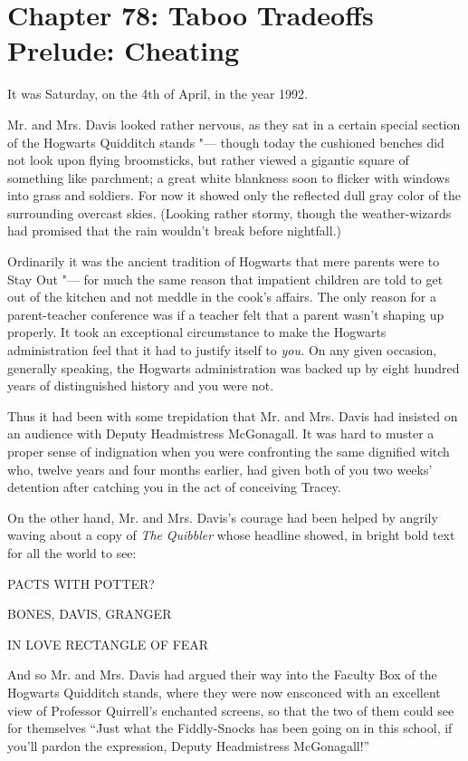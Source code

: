 \chapter{Chapter 78: Taboo Tradeoffs Prelude: Cheating}
It was Saturday, on the 4th of April, in the year 1992.

Mr. and Mrs. Davis looked rather nervous, as they sat in a certain
special section of the Hogwarts Quidditch stands "--- though today the
cushioned benches did not look upon flying broomsticks, but rather
viewed a gigantic square of something like parchment; a great white
blankness soon to flicker with windows into grass and soldiers. For now
it showed only the reflected dull gray color of the surrounding overcast
skies. (Looking rather stormy, though the weather-wizards had promised
that the rain wouldn't break before nightfall.)

Ordinarily it was the ancient tradition of Hogwarts that mere parents
were to Stay Out "--- for much the same reason that impatient children are
told to get out of the kitchen and not meddle in the cook's affairs. The
only reason for a parent-teacher conference was if a teacher felt that a
parent wasn't shaping up properly. It took an exceptional circumstance
to make the Hogwarts administration feel that it had to justify itself
to \emph{you.} On any given occasion, generally speaking, the Hogwarts
administration was backed up by eight hundred years of distinguished
history and you were not.

Thus it had been with some trepidation that Mr. and Mrs. Davis had
insisted on an audience with Deputy Headmistress McGonagall. It was hard
to muster a proper sense of indignation when you were confronting the
same dignified witch who, twelve years and four months earlier, had
given both of you two weeks' detention after catching you in the act of
conceiving Tracey.

On the other hand, Mr. and Mrs. Davis's courage had been helped by
angrily waving about a copy of \emph{The} \emph{Quibbler} whose headline
showed, in bright bold text for all the world to see:

PACTS WITH POTTER?

BONES, DAVIS, GRANGER

IN LOVE RECTANGLE OF FEAR

And so Mr. and Mrs. Davis had argued their way into the Faculty Box of
the Hogwarts Quidditch stands, where they were now ensconced with an
excellent view of Professor Quirrell's enchanted screens, so that the
two of them could see for themselves ``Just what the Fiddly-Snocks has
been going on in this school, if you'll pardon the expression, Deputy
Headmistress McGonagall!''

